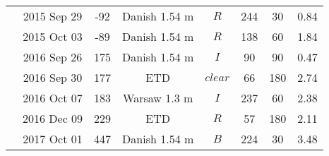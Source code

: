 \begin{table*}
\begin{tabular}{cccccccc}
    & 2015 Sep 29 & -92 & Danish 1.54 m & $R$ &  244 & 30 &  0.84\\
      & 2015 Oct 03 & -89 & Danish 1.54 m & $R$ &  138 & 60 &  1.84\\
      & 2016 Sep 26 & 175 & Danish 1.54 m & $I$ &  90 & 90 &  0.47\\
      & 2016 Sep 30 & 177 & ETD\footnotemark{e}& $clear$ & 66 & 180 & 2.74 \\
      & 2016 Oct 07 & 183 & Warsaw 1.3 m & $I$ & 237 & 60 &  2.38 \\ 
      & 2016 Dec 09 & 229 & ETD\footnotemark{e} & $R$ & 57 & 180 & 2.11 \\ 
      & 2017 Oct 01 & 447 & Danish 1.54 m & $B$ &  224 & 30 &   3.48\\
\hline                  
\end{tabular}
\end{table*}

